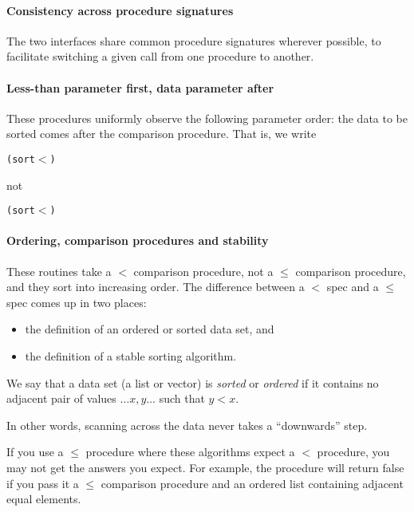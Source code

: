 \paragraph{Consistency across procedure signatures}

The two interfaces share common procedure signatures wherever
possible, to facilitate switching a given call from one procedure
to another.
        
\paragraph{Less-than parameter first, data parameter after}

These procedures uniformly observe the following parameter order:
the data to be sorted comes after the comparison procedure.
That is, we write
%
\begin{alltt}
  (sort \(<\) )
\end{alltt}
%
not
%
\begin{alltt}
  (sort  \(<\))
\end{alltt}
%

\paragraph{Ordering, comparison procedures and stability}

These routines take a $<$ comparison procedure, not a $\leq$ comparison
procedure, and they sort into increasing order. The difference between
a $<$ spec and a $\leq$ spec comes up in two places: 

\begin{itemize}
\item the definition of an ordered or sorted data set, and
\item the definition of a stable sorting algorithm.
\end{itemize}
%

We say that a data set (a list or vector) is \textit{sorted} or
\textit{ordered} if it contains no adjacent pair of values $\ldots x,
y \ldots$ such that $y < x$.

In other words, scanning across the data never takes a ``downwards'' step.

If you use a $\leq$ procedure where these algorithms expect a $<$
procedure, you may not get the answers you expect. For example,
the  procedure will return false if you pass it a $\leq$ comparison
procedure and an ordered list containing adjacent equal elements.

